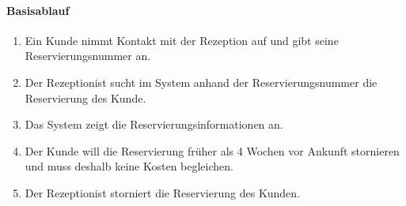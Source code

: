 \paragraph{Basisablauf}
\begin{enumerate}
\item Ein \Gls{Kunde} nimmt Kontakt mit der \Gls{Rezeption} auf und gibt seine \Gls{Reservierungsnummer} an.
\item Der \Gls{Rezeptionist} sucht im System anhand der \Gls{Reservierungsnummer} die \Gls{Reservierung} des \Gls{Kunde}.
\item Das System zeigt die Reservierungsinformationen an.
\item Der \Gls{Kunde} will die \Gls{Reservierung} früher als 4 Wochen vor Ankunft stornieren und muss deshalb keine Kosten begleichen.
\item Der \Gls{Rezeptionist} storniert die Reservierung des \Gls{Kunde}n.
\end{enumerate}

